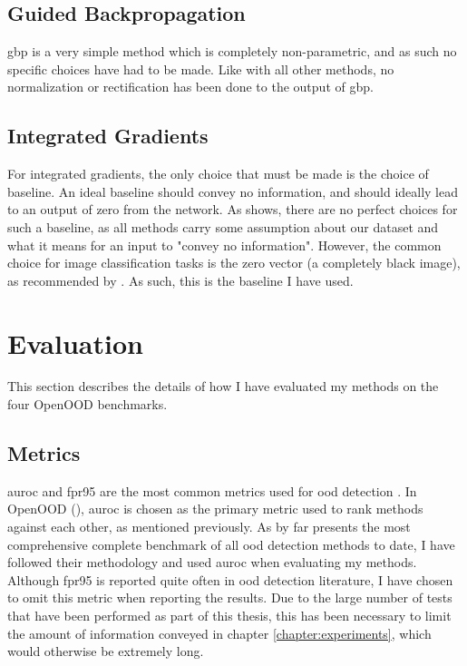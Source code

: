 \documentclass[UKenglish]{uiomasterthesis} %
\theoremstyle{definition}
\begin{document}
\subsection{Guided Backpropagation}

\ac{gbp} is a very simple method which is completely non-parametric, and as such no specific choices have had to be made. Like with all other methods, no normalization or rectification has been done to the output of \ac{gbp}.

\subsection{Integrated Gradients}

For integrated gradients, the only choice that must be made is the choice of baseline. An ideal baseline should convey no information, and should ideally lead to an output of zero from the network. As \cite{sturmfels2020visualizing} shows, there are no perfect choices for such a baseline, as all methods carry some assumption about our dataset and what it means for an input to "convey no information". However, the common choice for image classification tasks is the zero vector (a completely black image), as recommended by \cite{integratedgradients}. As such, this is the baseline I have used.

\section{Evaluation}

This section describes the details of how I have evaluated my methods on the four OpenOOD benchmarks.


\subsection{Metrics}

\ac{auroc} and \ac{fpr95} are the most common metrics used for \ac{ood} detection \cite{oodbaseline, odin, oodoverview, openood, vim}. In OpenOOD (\cite{openood}), \ac{auroc} is chosen as the primary metric used to rank methods against each other, as mentioned previously. As \cite{openood} by far presents the most comprehensive complete benchmark of all \ac{ood} detection methods to date, I have followed their methodology and used \ac{auroc} when evaluating my methods. Although \ac{fpr95} is reported quite often in \ac{ood} detection literature, I have chosen to omit this metric when reporting the results. Due to the large number of tests that have been performed as part of this thesis, this has been necessary to limit the amount of information conveyed in chapter \ref{chapter:experiments}, which would otherwise be extremely long. %
\end{document}

